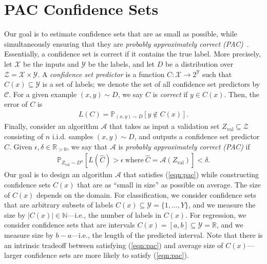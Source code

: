 \documentclass{article} \usepackage{iclr2020_conference,times}
\renewcommand{\(}						{\left(}
\renewcommand{\)}						{\right)}
\renewcommand{\[}						{\left[}
\renewcommand{\]}						{\right]}
\newcommand{\<}						{\left<}
\renewcommand{\>}						{\right>}
\begin{document}
 

\section{PAC Confidence Sets}





Our goal is to estimate confidence sets that are as small as possible, while simultaneously ensuring that they are \emph{probably approximately correct (PAC)}~\citep{valiant1984theory}. Essentially, a confidence set is correct if it contains the true label. More precisely, let $\mathcal{X}$ be the inputs and $\mathcal{Y}$ be the labels, and let $D$ be a distribution over $\mathcal{Z}=\mathcal{X}\times\mathcal{Y}$. A \emph{confidence set predictor} is a function $C:\mathcal{X}\to2^{\mathcal{Y}}$ such that $C(x)\subseteq\mathcal{Y}$ is a set of labels; we denote the set of all confidence set predictors by $\mathcal{C}$. For a given example $(x,y)\sim D$, we say $C$ is \emph{correct} if $y\in C(x)$. Then, the error of $C$ is
\begin{align}
\label{eqn:error}
L(C)=\mathbb{P}_{(x,y)\sim D}[y\not\in C(x)].
\end{align}
Finally, consider an algorithm $\mathcal{A}$ that takes as input a validation set $Z_{\text{val}}\subseteq\mathcal{Z}$ consisting of $n$ i.i.d. samples $(x,y)\sim D$, and outputs a confidence set predictor $\hat{C}$. Given $\epsilon,\delta\in\mathbb{R}_{>0}$, we say that $\mathcal{A}$ is \emph{probably approximately correct (PAC)} if
\begin{align}
\label{eqn:pac}
\mathbb{P}_{Z_{\text{val}}\sim D^n}\left[L(\hat{C})>\epsilon~\text{where}~\hat{C}=\mathcal{A}(Z_{\text{val}})\right]<\delta.
\end{align}
Our goal is to design an algorithm $\mathcal{A}$ that satisfies (\ref{eqn:pac}) while constructing confidence sets $C(x)$ that are as ``small in size'' as possible on average. The size of $C(x)$ depends on the domain. For classification, we consider confidence sets that are arbitrary subsets of labels $C(x)\subseteq\mathcal{Y}=\{1,...,Y\}$, and we measure the size by $|C(x)|\in\mathbb{N}$---i.e., the number of labels in $C(x)$. For regression, we consider confidence sets that are intervals $C(x)=[a,b]\subseteq\mathcal{Y}=\mathbb{R}$, and we measure size by $b-a$---i.e., the length of the predicted interval. Note that there is an intrinsic tradeoff between satisfying (\ref{eqn:pac}) and average size of $C(x)$---larger confidence sets are more likely to satisfy (\ref{eqn:pac}).
\end{document}
